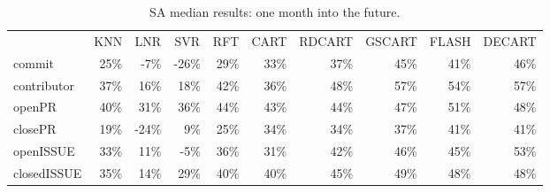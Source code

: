 \documentclass[smallextended]{svjour3}
\begin{document}
\begin{table}[!t]
\centering
\caption{
SA median  results:  one month into the future.}
\label{tbl:med_sa} 
\begin{adjustbox}{max width=0.96\textwidth}     
\begin{tabular}{lrrrrrrrrr}
            & \multicolumn{1}{c}{KNN}      & \multicolumn{1}{c}{LNR}       & \multicolumn{1}{c}{SVR}       & \multicolumn{1}{c}{RFT}      & \multicolumn{1}{c}{CART}     & \multicolumn{1}{c}{RDCART}   & \multicolumn{1}{c}{GSCART}   & \multicolumn{1}{c}{FLASH}    & \multicolumn{1}{c}{DECART}   \\
commit      & \cellcolor[HTML]{DCDCDC}25\% & \cellcolor[HTML]{929292}-7\%  & \cellcolor[HTML]{666666}-26\% & \cellcolor[HTML]{E6E6E6}29\% & \cellcolor[HTML]{EFEFEF}33\% & \cellcolor[HTML]{F1F1F1}37\% & \cellcolor[HTML]{F7F7F7}45\% & \cellcolor[HTML]{F4F4F4}41\% & \cellcolor[HTML]{F7F7F7}46\% \\
contributor & \cellcolor[HTML]{F1F1F1}37\% & \cellcolor[HTML]{C7C7C7}16\%  & \cellcolor[HTML]{CCCCCC}18\%  & \cellcolor[HTML]{F5F5F5}42\% & \cellcolor[HTML]{F1F1F1}36\% & \cellcolor[HTML]{F9F9F9}48\% & \cellcolor[HTML]{FFFFFF}57\% & \cellcolor[HTML]{FDFDFD}54\% & \cellcolor[HTML]{FFFFFF}57\% \\
openPR      & \cellcolor[HTML]{F3F3F3}40\% & \cellcolor[HTML]{EAEAEA}31\%  & \cellcolor[HTML]{F1F1F1}36\%  & \cellcolor[HTML]{F6F6F6}44\% & \cellcolor[HTML]{F5F5F5}43\% & \cellcolor[HTML]{F6F6F6}44\% & \cellcolor[HTML]{F8F8F8}47\% & \cellcolor[HTML]{FBFBFB}51\% & \cellcolor[HTML]{F9F9F9}48\% \\
closePR     & \cellcolor[HTML]{CECECE}19\% & \cellcolor[HTML]{6A6A6A}-24\% & \cellcolor[HTML]{B7B7B7}9\%   & \cellcolor[HTML]{DCDCDC}25\% & \cellcolor[HTML]{EFEFEF}34\% & \cellcolor[HTML]{EFEFEF}34\% & \cellcolor[HTML]{F1F1F1}37\% & \cellcolor[HTML]{F4F4F4}41\% & \cellcolor[HTML]{F4F4F4}41\% \\
openISSUE   & \cellcolor[HTML]{EFEFEF}33\% & \cellcolor[HTML]{BCBCBC}11\%  & \cellcolor[HTML]{969696}-5\%  & \cellcolor[HTML]{F1F1F1}36\% & \cellcolor[HTML]{EAEAEA}31\% & \cellcolor[HTML]{F5F5F5}42\% & \cellcolor[HTML]{F7F7F7}46\% & \cellcolor[HTML]{F7F7F7}45\% & \cellcolor[HTML]{FCFCFC}53\% \\
closedISSUE & \cellcolor[HTML]{F0F0F0}35\% & \cellcolor[HTML]{C3C3C3}14\%  & \cellcolor[HTML]{E6E6E6}29\%  & \cellcolor[HTML]{F3F3F3}40\% & \cellcolor[HTML]{F3F3F3}40\% & \cellcolor[HTML]{F7F7F7}45\% & \cellcolor[HTML]{F9F9F9}49\% & \cellcolor[HTML]{F9F9F9}48\% & \cellcolor[HTML]{F9F9F9}48\%
\end{tabular}
\end{adjustbox}
\end{table}
\end{document}
